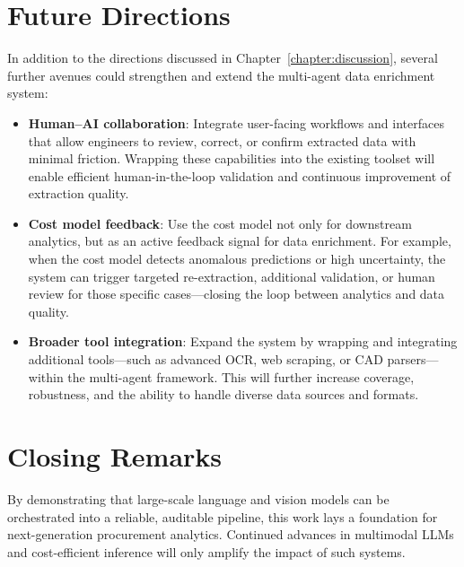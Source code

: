 \section{Future Directions}
In addition to the directions discussed in Chapter~\ref{chapter:discussion}, several further avenues could strengthen and extend the multi-agent data enrichment system:
\begin{itemize}
  \item \textbf{Human–AI collaboration}: Integrate user-facing workflows and interfaces that allow engineers to review, correct, or confirm extracted data with minimal friction. Wrapping these capabilities into the existing toolset will enable efficient human-in-the-loop validation and continuous improvement of extraction quality.
  \item \textbf{Cost model feedback}: Use the cost model not only for downstream analytics, but as an active feedback signal for data enrichment. For example, when the cost model detects anomalous predictions or high uncertainty, the system can trigger targeted re-extraction, additional validation, or human review for those specific cases—closing the loop between analytics and data quality.
  \item \textbf{Broader tool integration}: Expand the system by wrapping and integrating additional tools—such as advanced OCR, web scraping, or CAD parsers—within the multi-agent framework. This will further increase coverage, robustness, and the ability to handle diverse data sources and formats.
\end{itemize}

\section{Closing Remarks}
By demonstrating that large-scale language and vision models can be orchestrated into a reliable, auditable pipeline, this work lays a foundation for next-generation procurement analytics.  Continued advances in multimodal LLMs and cost-efficient inference will only amplify the impact of such systems.